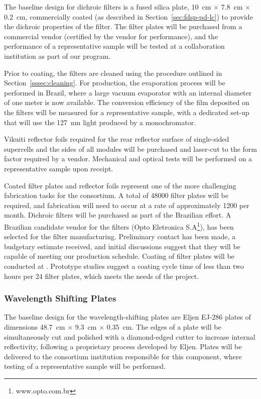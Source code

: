 The baseline design for dichroic filters is 
a fused silica plate,  \SI{10}{cm} $\times$ \SI{7.8}{cm} $\times$ \SI{0.2}{cm}, commercially coated (as described in Section~\ref{sec:fdsp-pd-lc}) to provide the dichroic properties of the filter.  
The filter plates will be purchased from a commercial vendor (certified by the vendor for performance), and the performance of a representative sample will be tested at a collaboration institution as part of our  program.  

Prior to coating, the filters are cleaned using the procedure outlined in Section~\ref{sssec:cleaning}.
For  production, the evaporation process will be performed
in Brazil, where a large vacuum evaporator with an internal diameter of one meter is now available. The conversion efficiency of the film deposited on the filters will be measured for a representative sample, with a dedicated set-up that will use the \SI{127}{nm} light produced by a  monochromator.

Vikuiti reflector foils required for the rear reflector surface of single-sided  supercells and the sides of all modules will be purchased and laser-cut to the form factor required by a vendor.  Mechanical and optical  tests will be performed on a representative sample upon receipt.

Coated filter plates and reflector foils represent one of the more challenging fabrication tasks for the consortium.  A total of \num{48000} filter plates will be required, and fabrication will need to occur at a rate of approximately \num{1200} per month.  Dichroic filters will be purchased as part of the Brazilian effort.  A Brazilian candidate vendor for the filters (Opto Eletronica S.A\footnote{www.opto.com.br}), has been selected for the filter manufacturing.  Preliminary contact has been made, a budgetary estimate received, and initial discussions suggest that they will be capable of meeting our production schedule.  Coating of filter plates will be conducted at .  Prototype studies suggest a coating cycle time of less than two hours per \num{24} filter plates, which meets the needs of the project.

\subsubsection{Wavelength Shifting Plates}

The baseline design for the wavelength-shifting plates are Eljen EJ-286 plates of dimensions \SI{48.7}{cm} $\times$ \SI{9.3}{cm} $\times$ \SI{0.35}{cm}.  The edges of a plate will be simultaneously cut and polished with a diamond-edged cutter to increase internal reflectivity, following a proprietary process developed by Eljen.  Plates will be delivered to the consortium institution responsible for this component, where  testing of a representative sample will be performed.

